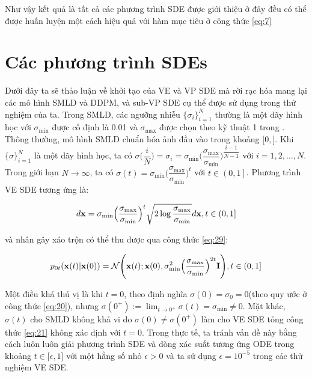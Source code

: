 \documentclass{article} %
\begin{document}
Như vậy kết quả là tất cả các phương trình SDE được giới thiệu ở đây đều có thể được huấn luyện một cách hiệu quả với hàm mục tiêu ở công thức \ref{eq:7}

\section{Các phương trình SDEs} \label{C}

Dưới đây ta sẽ thảo luận về khởi tạo của VE và VP SDE mà rời rạc hóa mang lại các mô hình SMLD và DDPM, và sub-VP SDE cụ thể được sử dụng trong thử nghiệm của ta.
Trong SMLD, các ngưỡng nhiễu $\lbrace \sigma_i \rbrace_{i=1}^N$ thường là một dãy hình học với $\sigma_{\min}$ được cố định là 0.01 và $\sigma_{\max}$ được chọn theo kỹ thuật 1 trong \citep{song2020improved}.
Thông thường, mô hình SMLD chuẩn hóa ảnh đầu vào trong khoảng $\lbrack 0, \rbrack$.
Khi $\lbrace \sigma \rbrace_{i=1}^N$ là một dãy hình học, ta có $\sigma\big( \dfrac{i}{N} \big)=\sigma_i=\sigma_{\min} \Big( \dfrac{\sigma_{\max}}{\sigma_{\min}} \Big)^{\dfrac{i-1}{N-1}}$ với $i=1, 2, \dots, N$.
Trong giới hạn $N \rightarrow \infty$, ta có $\sigma(t) = \sigma_{\min} \Big( \dfrac{\sigma_{\max}}{\sigma_{\min}} \Big)^t$ với $t \in \left ( 0, 1 \right ]$.
Phương trình VE SDE tương ứng là:

\begin{equation} \label{eq:30}
    d \bold{x} = \sigma_{\min} \Big( \dfrac{\sigma_{\max}}{\sigma_{\min}} \Big)^t \sqrt{2 \log \dfrac{\sigma_{\max}}{\sigma_{\min}}} d \bold{x}, t \in \left ( 0, 1 \right ]
\end{equation}

và nhân gây xáo trộn có thể thu được qua công thức \ref{eq:29}:

\begin{equation} \label{eq:31}
    p_{0t}(\bold{x} (t) \vert \bold{x}(0)) = \mathcal{N} \Bigg ( \bold{x}(t); \bold{x}(0), \sigma_{\min}^2 \Big( \dfrac{\sigma_{\max}}{\sigma_{\min}} \Big)^{2t} \bold{I} \Bigg), t \in \left ( 0, 1 \right ]
\end{equation}

Một điều khá thú vị là khi $t=0$, theo định nghĩa $\sigma(0) = \sigma_0 = 0$(theo quy ước ở công thức \ref{eq:20}), nhưng $\sigma(0^+):=\lim_{t \rightarrow 0^+}\sigma(t)= \sigma_{\min} \neq 0$.
Mặt khác, $\sigma(t)$ cho SMLD không khả vi do $\sigma(0) \neq \sigma(0^+)$ làm cho VE SDE tỏng công thức \ref{eq:21} không xác định với $t=0$.
Trong thực tế, ta tránh vấn đề này bằng cách luôn luôn giải phương trình SDE và dòng xác suất tương ứng ODE trong khoảng $t \in \lbrack \epsilon, 1 \rbrack$ với một hằng số nhỏ $\epsilon > 0$ và ta sử dụng $\epsilon = 10^{-5}$ trong các thử nghiệm VE SDE.
\end{document}
